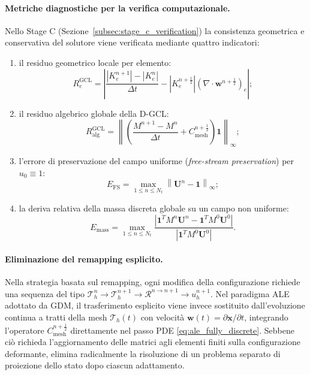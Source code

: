 \paragraph{Metriche diagnostiche per la verifica computazionale.}

Nello Stage C (Sezione~\ref{subsec:stage_c_verification}) la consistenza geometrica e conservativa del solutore viene verificata mediante quattro indicatori:
\begin{enumerate}
    \item il residuo geometrico locale per elemento:
    \begin{equation}
    R_e^{\mathrm{GCL}}
    =
    \left|
    \frac{|K_e^{n+1}|-|K_e^n|}{\Delta t}
    -
    |K_e^{n+\frac12}|
    \left(\nabla\cdot\mathbf{w}^{n+\frac12}\right)_e
    \right|;
    \label{eq:elemental_gcl_residual}
    \end{equation}
    \item il residuo algebrico globale della D-GCL:
    \begin{equation}
    R_{\mathrm{alg}}^{\mathrm{GCL}}
    =
    \left\|
    \left(
    \frac{M^{n+1}-M^n}{\Delta t}
    +
    C_{\mathrm{mesh}}^{n+\frac12}
    \right)\mathbf{1}
    \right\|_{\infty};
    \label{eq:algebraic_gcl_residual}
    \end{equation}
    \item l'errore di preservazione del campo uniforme (\textit{free-stream preservation}) per $u_0 \equiv 1$:
    \begin{equation}
    E_{\mathrm{FS}}
    =
    \max_{1\leq n\leq N_t}
    \left\|\mathbf{U}^n-\mathbf{1}\right\|_{\infty};
    \label{eq:free_stream_error}
    \end{equation}
    \item la deriva relativa della massa discreta globale su un campo non uniforme:
    \begin{equation}
    E_{\mathrm{mass}}
    =
    \max_{1\leq n\leq N_t}
    \frac{
    \left|\mathbf{1}^T M^n\mathbf{U}^n - \mathbf{1}^T M^0\mathbf{U}^0\right|
    }{
    \left|\mathbf{1}^T M^0\mathbf{U}^0\right|
    }.
    \label{eq:discrete_mass_drift_metric}
    \end{equation}
\end{enumerate}

\paragraph{Eliminazione del remapping esplicito.}

Nella strategia basata sul remapping, ogni modifica della configurazione richiede una sequenza del tipo $\mathcal{T}_h^n \longrightarrow \mathcal{T}_h^{n+1} \longrightarrow \mathcal{R}^{n\rightarrow n+1} \longrightarrow u_h^{n+1}$. Nel paradigma ALE adottato da GDM, il trasferimento esplicito viene invece sostituito dall'evoluzione continua a tratti della mesh $\mathcal{T}_h(t)$ con velocità $\mathbf{w}(t) = \partial\mathbf{x}/\partial t$, integrando l'operatore $C_{\mathrm{mesh}}^{n+\frac12}$ direttamente nel passo PDE \eqref{eq:ale_fully_discrete}. Sebbene ciò richieda l'aggiornamento delle matrici agli elementi finiti sulla configurazione deformante, elimina radicalmente la risoluzione di un problema separato di proiezione dello stato dopo ciascun adattamento.
